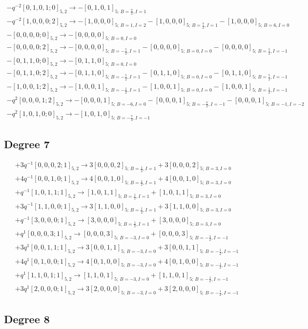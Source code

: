 \documentclass{article}
\begin{document}
\[\begin{gathered} -q^{-2}[0,1,0,1;0]_{5,2}\longrightarrow -[0,1,0,1]_{5;\,B=\frac{7}{2},I=1}\\-q^{-2}[1,0,0,0;2]_{5,2}\longrightarrow -[1,0,0,0]_{5;\,B=1,I=2} -[1,0,0,0]_{5;\,B=\frac{7}{2},I=1} -[1,0,0,0]_{5;\,B=6,I=0}\\-[0,0,0,0;0]_{5,2}\longrightarrow -[0,0,0,0]_{5;\,B=0,I=0}\\-[0,0,0,0;2]_{5,2}\longrightarrow -[0,0,0,0]_{5;\,B=-\frac{5}{2},I=1} -[0,0,0,0]_{5;\,B=0,I=0} -[0,0,0,0]_{5;\,B=\frac{5}{2},I=-1}\\-[0,1,1,0;0]_{5,2}\longrightarrow -[0,1,1,0]_{5;\,B=0,I=0}\\-[0,1,1,0;2]_{5,2}\longrightarrow -[0,1,1,0]_{5;\,B=-\frac{5}{2},I=1} -[0,1,1,0]_{5;\,B=0,I=0} -[0,1,1,0]_{5;\,B=\frac{5}{2},I=-1}\\-[1,0,0,1;2]_{5,2}\longrightarrow -[1,0,0,1]_{5;\,B=-\frac{5}{2},I=1} -[1,0,0,1]_{5;\,B=0,I=0} -[1,0,0,1]_{5;\,B=\frac{5}{2},I=-1}\\-q^{2}[0,0,0,1;2]_{5,2}\longrightarrow -[0,0,0,1]_{5;\,B=-6,I=0} -[0,0,0,1]_{5;\,B=-\frac{7}{2},I=-1} -[0,0,0,1]_{5;\,B=-1,I=-2}\\-q^{2}[1,0,1,0;0]_{5,2}\longrightarrow -[1,0,1,0]_{5;\,B=-\frac{7}{2},I=-1}\end{gathered}\]\subsection*{Degree 7}
\[\begin{gathered} +3q^{-1}[0,0,0,2;1]_{5,2}\longrightarrow 3[0,0,0,2]_{5;\,B=\frac{1}{2},I=1} +3[0,0,0,2]_{5;\,B=3,I=0}\\+4q^{-1}[0,0,1,0;1]_{5,2}\longrightarrow 4[0,0,1,0]_{5;\,B=\frac{1}{2},I=1} +4[0,0,1,0]_{5;\,B=3,I=0}\\+q^{-1}[1,0,1,1;1]_{5,2}\longrightarrow [1,0,1,1]_{5;\,B=\frac{1}{2},I=1} +[1,0,1,1]_{5;\,B=3,I=0}\\+3q^{-1}[1,1,0,0;1]_{5,2}\longrightarrow 3[1,1,0,0]_{5;\,B=\frac{1}{2},I=1} +3[1,1,0,0]_{5;\,B=3,I=0}\\+q^{-1}[3,0,0,0;1]_{5,2}\longrightarrow [3,0,0,0]_{5;\,B=\frac{1}{2},I=1} +[3,0,0,0]_{5;\,B=3,I=0}\\+q^{1}[0,0,0,3;1]_{5,2}\longrightarrow [0,0,0,3]_{5;\,B=-3,I=0} +[0,0,0,3]_{5;\,B=-\frac{1}{2},I=-1}\\+3q^{1}[0,0,1,1;1]_{5,2}\longrightarrow 3[0,0,1,1]_{5;\,B=-3,I=0} +3[0,0,1,1]_{5;\,B=-\frac{1}{2},I=-1}\\+4q^{1}[0,1,0,0;1]_{5,2}\longrightarrow 4[0,1,0,0]_{5;\,B=-3,I=0} +4[0,1,0,0]_{5;\,B=-\frac{1}{2},I=-1}\\+q^{1}[1,1,0,1;1]_{5,2}\longrightarrow [1,1,0,1]_{5;\,B=-3,I=0} +[1,1,0,1]_{5;\,B=-\frac{1}{2},I=-1}\\+3q^{1}[2,0,0,0;1]_{5,2}\longrightarrow 3[2,0,0,0]_{5;\,B=-3,I=0} +3[2,0,0,0]_{5;\,B=-\frac{1}{2},I=-1}\end{gathered}\]\subsection*{Degree 8}
\end{document}
